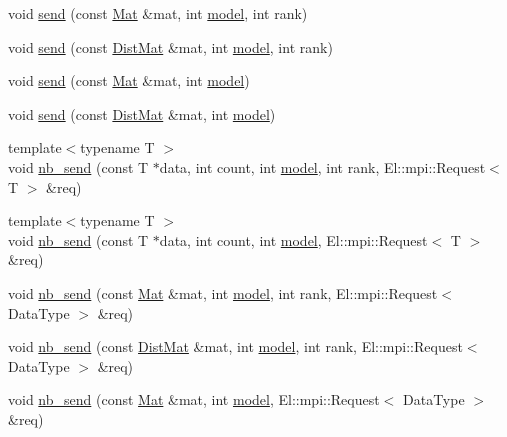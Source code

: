 \begin{DoxyCompactItemize}
\item 
void \hyperlink{classlbann_1_1lbann__comm_ac3fa03c3ee8351daed6c7a5fd6f8535d}{send} (const \hyperlink{base_8hpp_a68f11fdc31b62516cb310831bbe54d73}{Mat} \&mat, int \hyperlink{classlbann_1_1model}{model}, int rank)
\item 
void \hyperlink{classlbann_1_1lbann__comm_ae6ad297cccfc9ed893b855046d60b34d}{send} (const \hyperlink{base_8hpp_a0fab5387556805cfeac3e7e567bf66c5}{Dist\+Mat} \&mat, int \hyperlink{classlbann_1_1model}{model}, int rank)
\item 
void \hyperlink{classlbann_1_1lbann__comm_a4dc53b43a36e597a0c11266ea3c6d7f7}{send} (const \hyperlink{base_8hpp_a68f11fdc31b62516cb310831bbe54d73}{Mat} \&mat, int \hyperlink{classlbann_1_1model}{model})
\item 
void \hyperlink{classlbann_1_1lbann__comm_aeb76535e61e5bc669ebadad223e4add7}{send} (const \hyperlink{base_8hpp_a0fab5387556805cfeac3e7e567bf66c5}{Dist\+Mat} \&mat, int \hyperlink{classlbann_1_1model}{model})
\item 
{\footnotesize template$<$typename T $>$ }\\void \hyperlink{classlbann_1_1lbann__comm_a70679ca6477c56972f9bc53d52e5ce21}{nb\+\_\+send} (const T $\ast$data, int count, int \hyperlink{classlbann_1_1model}{model}, int rank, El\+::mpi\+::\+Request$<$ T $>$ \&req)
\item 
{\footnotesize template$<$typename T $>$ }\\void \hyperlink{classlbann_1_1lbann__comm_a6d9de11c64685e0983b196044856d281}{nb\+\_\+send} (const T $\ast$data, int count, int \hyperlink{classlbann_1_1model}{model}, El\+::mpi\+::\+Request$<$ T $>$ \&req)
\item 
void \hyperlink{classlbann_1_1lbann__comm_ae86cb0f65c8e11dec7a1cf0d3ce17cd2}{nb\+\_\+send} (const \hyperlink{base_8hpp_a68f11fdc31b62516cb310831bbe54d73}{Mat} \&mat, int \hyperlink{classlbann_1_1model}{model}, int rank, El\+::mpi\+::\+Request$<$ Data\+Type $>$ \&req)
\item 
void \hyperlink{classlbann_1_1lbann__comm_ad77344b63311b7ec57c63af67120c3e6}{nb\+\_\+send} (const \hyperlink{base_8hpp_a0fab5387556805cfeac3e7e567bf66c5}{Dist\+Mat} \&mat, int \hyperlink{classlbann_1_1model}{model}, int rank, El\+::mpi\+::\+Request$<$ Data\+Type $>$ \&req)
\item 
void \hyperlink{classlbann_1_1lbann__comm_a7d22130a7d24a710fe6b31c0ccec78b1}{nb\+\_\+send} (const \hyperlink{base_8hpp_a68f11fdc31b62516cb310831bbe54d73}{Mat} \&mat, int \hyperlink{classlbann_1_1model}{model}, El\+::mpi\+::\+Request$<$ Data\+Type $>$ \&req)

\end{DoxyCompactItemize}
